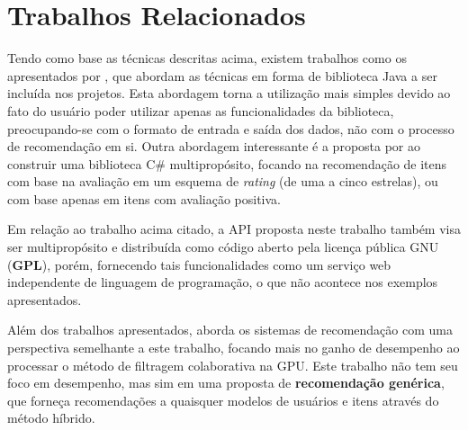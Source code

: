 \documentclass[12pt, openright, oneside, a4paper, brazil]{abntex2}
\begin{document}
\section{Trabalhos Relacionados} \label{related_work}

Tendo como base as técnicas descritas acima, existem trabalhos como os apresentados por , que abordam as técnicas em forma de biblioteca Java a ser incluída nos projetos. Esta abordagem torna a utilização mais simples devido ao fato do usuário poder utilizar apenas as funcionalidades da biblioteca, preocupando-se com o formato de entrada e saída dos dados, não com o processo de recomendação em si. Outra abordagem interessante é a proposta por  ao construir uma biblioteca C\# multipropósito, focando na recomendação de itens com base na avaliação em um esquema de \textit{rating} (de uma a cinco estrelas), ou com base apenas em itens com avaliação positiva.

Em relação ao trabalho acima citado, a API proposta neste trabalho também visa ser multipropósito e distribuída como código aberto pela licença pública GNU (\textbf{GPL}), porém, fornecendo tais funcionalidades como um serviço web independente de linguagem de programação, o que não acontece nos exemplos apresentados.

Além dos trabalhos apresentados,  aborda os sistemas de recomendação com uma perspectiva semelhante a este trabalho, focando mais no ganho de desempenho ao processar o método de filtragem colaborativa na GPU. Este trabalho não tem seu foco em desempenho, mas sim em uma proposta de \textbf{recomendação genérica}, que forneça recomendações a quaisquer modelos de usuários e itens através do método híbrido.

%
%

\cleardoublepage



\postextual


\end{document}
